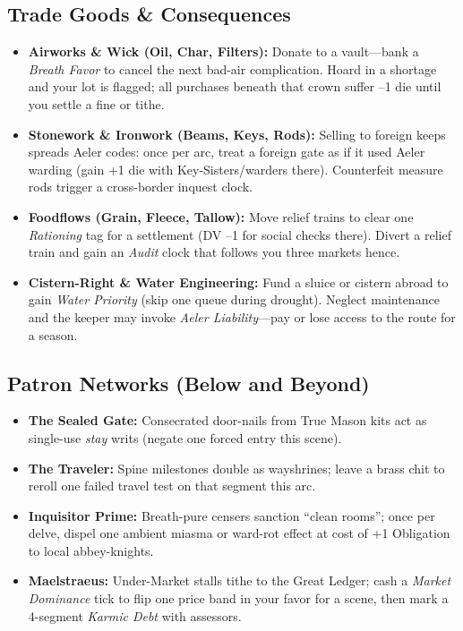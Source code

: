 \subsection*{Trade Goods \& Consequences}
\begin{itemize}
  \item \textbf{Airworks \& Wick (Oil, Char, Filters):} Donate to a vault—bank a \emph{Breath Favor} to cancel the next bad-air complication. Hoard in a shortage and your lot is flagged; all purchases beneath that crown suffer --1 die until you settle a fine or tithe.
  \item \textbf{Stonework \& Ironwork (Beams, Keys, Rods):} Selling to foreign keeps spreads Aeler codes: once per arc, treat a foreign gate as if it used Aeler warding (gain +1 die with Key-Sisters/warders there). Counterfeit measure rods trigger a cross-border inquest clock.
  \item \textbf{Foodflows (Grain, Fleece, Tallow):} Move relief trains to clear one \emph{Rationing} tag for a settlement (DV --1 for social checks there). Divert a relief train and gain an \emph{Audit} clock that follows you three markets hence.
  \item \textbf{Cistern-Right \& Water Engineering:} Fund a sluice or cistern abroad to gain \emph{Water Priority} (skip one queue during drought). Neglect maintenance and the keeper may invoke \emph{Aeler Liability}—pay or lose access to the route for a season.
\end{itemize}

\subsection*{Patron Networks (Below and Beyond)}
\begin{itemize}
  \item \textbf{The Sealed Gate:} Consecrated door-nails from True Mason kits act as single-use \emph{stay} writs (negate one forced entry this scene).
  \item \textbf{The Traveler:} Spine milestones double as wayshrines; leave a brass chit to reroll one failed travel test on that segment this arc.
  \item \textbf{Inquisitor Prime:} Breath-pure censers sanction “clean rooms”; once per delve, dispel one ambient miasma or ward-rot effect at cost of +1 Obligation to local abbey-knights.
  \item \textbf{Maelstraeus:} Under-Market stalls tithe to the Great Ledger; cash a \emph{Market Dominance} tick to flip one price band in your favor for a scene, then mark a 4-segment \emph{Karmic Debt} with assessors.
\end{itemize}

